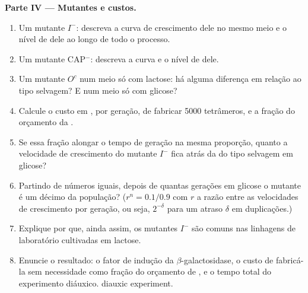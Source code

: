 \begin{problem}
\medskip
\noindent\textbf{Parte IV --- Mutantes e custos.}
\begin{enumerate}[resume]
  \item Um mutante $I^-$: descreva a curva de crescimento dele no mesmo
        meio e o nível de  dele ao longo de todo o processo.
  \item Um mutante CAP$^-$: descreva a curva e o nível de  dele.
  \item Um mutante $O^c$ num meio só com lactose: há alguma diferença em
        relação ao tipo selvagem? E num meio só com glicose?
  \item Calcule o custo em , por geração, de fabricar \num{5000}
        tetrâmeros, e a fração do orçamento da .
  \item Se essa fração alongar o tempo de geração na mesma proporção,
        quanto a velocidade de crescimento do mutante $I^-$ fica atrás
        da do tipo selvagem em glicose?
  \item Partindo de números iguais, depois de quantas gerações em
        glicose o mutante é um décimo da população? ($r^n =
        0.1/0.9$ com $r$ a razão entre as velocidades de crescimento por
        geração, ou seja, $2^{-\delta}$ para um atraso $\delta$ em
        duplicações.)
  \item Explique por que, ainda assim, os mutantes $I^-$ são comuns nas
        linhagens de laboratório cultivadas em lactose.
  \item Enuncie o resultado: o fator de indução da
        $\beta$-galactosidase, o custo de fabricá-la sem necessidade
        como fração do orçamento de , e o tempo total do experimento
        diáuxico.
        diauxic experiment.
\end{enumerate}
\end{problem}

